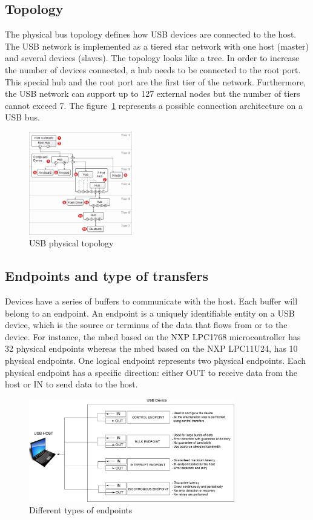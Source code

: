 \documentclass[pdftex,10pt,a4paper]{report}
\begin{document}
\subsection{Topology}
The physical bus topology defines how USB devices are connected to the host. The USB network is implemented as a tiered star network with one host (master) and several devices (slaves). The topology looks like a tree. In order to increase the number of devices connected, a hub needs to be connected to the root port. This special hub and the root port are the first tier of the network. Furthermore, the USB network can support up to 127 external nodes but the number of tiers cannot exceed 7. The figure~\ref{USB physical topology} represents a possible connection architecture on a USB bus.


\begin{figure}[h!]
		\centering
		\includegraphics[width=0.4\textwidth]{./usb_topology.jpg}
		\caption{USB physical topology \footnotemark}
		\label{USB physical topology}
\end{figure}
\subsection{Endpoints and type of transfers}
Devices have a series of buffers to communicate with the host. Each buffer will belong to an endpoint. An endpoint is a uniquely identifiable entity on a USB device, which is the source or terminus of the data that flows from or to the device. For instance, the mbed based on the NXP LPC1768 microcontroller has 32 physical endpoints whereas the mbed based on the NXP LPC11U24, has 10 physical endpoints. One logical endpoint represents two physical endpoints. Each physical endpoint has a specific direction: either OUT to receive data from the host or IN to send data to the host. 



\begin{figure}[h!]
		\centering
		\includegraphics[width=0.8\textwidth]{./endpoints.jpg}
		\caption{Different types of endpoints}
		\label{Different types of endpoints}
\end{figure}
\end{document}

